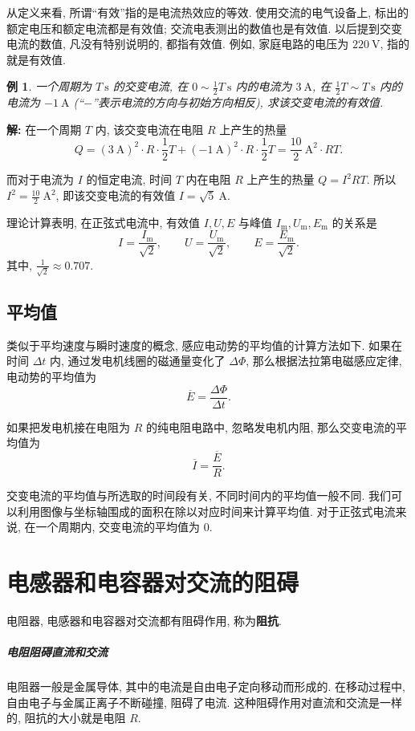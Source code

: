\documentclass[UTF8,openany,fontset=fandol]{ctexbook}
\theoremstyle{chinesetextbook}
\newtheorem{example}{例}[chapter]
\newenvironment{solution}{\par\indent\textbf{解:} \ignorespaces}{\par}
\newcommand{\unit}[1]{\ \mathrm{#1}}
\begin{document}
从定义来看, 所谓“有效”指的是电流热效应的等效. 使用交流的电气设备上, 标出的额定电压和额定电流都是有效值; 交流电表测出的数值也是有效值. 以后提到交变电流的数值, 凡没有特别说明的, 都指有效值. 例如, 家庭电路的电压为 $220\unit{V}$, 指的就是有效值.
\begin{example}
一个周期为 $T\unit{s}$ 的交变电流, 在 $\displaystyle0\sim\frac12T\unit{s}$ 内的电流为 $3\unit{A}$, 在 $\displaystyle\frac12T\sim T\unit{s}$ 内的电流为 $-1\unit{A}$ (“$-$”表示电流的方向与初始方向相反), 求该交变电流的有效值.
\end{example}
\begin{solution}
在一个周期 $T$ 内, 该交变电流在电阻 $R$ 上产生的热量
\[
Q=(3\unit{A})^2\cdot R\cdot\frac12T+(-1\unit{A})^2\cdot R\cdot\frac12T=\frac{10}{2}\unit{A^2}\cdot RT.
\]

而对于电流为 $I$ 的恒定电流, 时间 $T$ 内在电阻 $R$ 上产生的热量 $Q=I^2RT.$ 所以 $\displaystyle I^2=\frac{10}{2}\unit{A^2}$, 即该交变电流的有效值 $I=\sqrt{5}\unit{A}$.
\end{solution}
理论计算表明, 在正弦式电流中, 有效值 $I,U,E$ 与峰值 $I_\mathrm{m},U_\mathrm{m},E_\mathrm{m}$ 的关系是
\[
I=\frac{I_\mathrm{m}}{\sqrt{2}},\qquad
U=\frac{U_\mathrm{m}}{\sqrt{2}},\qquad
E=\frac{E_\mathrm{m}}{\sqrt{2}}.
\]
其中, $\displaystyle\frac{1}{\sqrt{2}}\approx 0.707.$
\subsection{平均值}
类似于平均速度与瞬时速度的概念, 感应电动势的平均值的计算方法如下. 如果在时间 $\Delta t$ 内, 通过发电机线圈的磁通量变化了 $\Delta\Phi$, 那么根据法拉第电磁感应定律, 电动势的平均值为
\[
\overline{E}=\frac{\Delta\Phi}{\Delta t}.
\]

如果把发电机接在电阻为 $R$ 的纯电阻电路中, 忽略发电机内阻, 那么交变电流的平均值为
\[
\overline{I}=\frac{\overline{E}}{R}.
\]

交变电流的平均值与所选取的时间段有关, 不同时间内的平均值一般不同. 我们可以利用图像与坐标轴围成的面积在除以对应时间来计算平均值. 对于正弦式电流来说, 在一个周期内, 交变电流的平均值为 0.
\section{电感器和电容器对交流的阻碍}
电阻器, 电感器和电容器对交流都有阻碍作用, 称为\textbf{阻抗}.

\subparagraph{电阻阻碍直流和交流} 电阻器一般是金属导体, 其中的电流是自由电子定向移动而形成的. 在移动过程中, 自由电子与金属正离子不断碰撞, 阻碍了电流. 这种阻碍作用对直流和交流是一样的, 阻抗的大小就是电阻 $R$.
\end{document}
